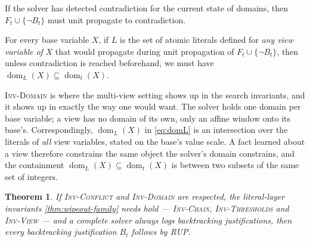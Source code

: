 \documentclass[11pt,a4paper]{article}
\theoremstyle{plain}
\newtheorem{theoremT}{Theorem}
\theoremstyle{definition}
\theoremstyle{remark}
\newcommand{\fname}[1]{\ensuremath{\operatorname{#1}}}
\newcommand{\dm}{\fname{dom}}
\newcommand{\inv}[1]{\textnormal{\textsc{Inv-#1}}}
\newcommand{\invChain}{\inv{Chain}}
\newcommand{\invThresholds}{\inv{Thresholds}}
\newcommand{\invView}{\inv{View}}
\newcommand{\invConflict}{\inv{Conflict}}
\newcommand{\invDomain}{\inv{Domain}}
\begin{document}
\begin{description}[font=\normalfont\bfseries,leftmargin=3.2em,style=nextline]
\item[\invConflict{} (thesis Inv2).]
  If the solver has detected contradiction for the current state of domains,
  then $F_t\cup\{\neg B_t\}$ must unit propagate to contradiction.
\item[\invDomain{} (thesis Inv3).]
  For every base variable $X$, if $L$ is the set of atomic literals defined for
  \emph{any view variable of} $X$ that would propagate during unit propagation
  of $F_t\cup\{\neg B_t\}$, then unless contradiction is reached beforehand, we
  must have $\dm_L(X)\subseteq\dm_t(X)$.
\end{description}

\invDomain{} is where the multi-view setting shows up in the search
invariants, and it shows up in exactly the way one would want.  The solver holds
one domain per base variable; a view has no domain of its own, only an affine
window onto its base's.  Correspondingly, $\dm_L(X)$ in \cref{eq:domL} is an
intersection over the literals of \emph{all} view variables, stated on the
base's value scale.  A fact learned about a view therefore constrains the same
object the solver's domain constrains, and the containment
$\dm_L(X)\subseteq\dm_t(X)$ is between two subsets of the same set of integers.

\begin{theoremT}
\label{thm:btrup}
If \invConflict{} and \invDomain{} are respected, the literal-layer invariants
\cref{thm:wipeout-family} needs hold --- \invChain{}, \invThresholds{} and \invView{} ---
and a complete solver always logs backtracking justifications, then every
backtracking justification $B_t$ follows by RUP.
\end{theoremT}
\end{document}

